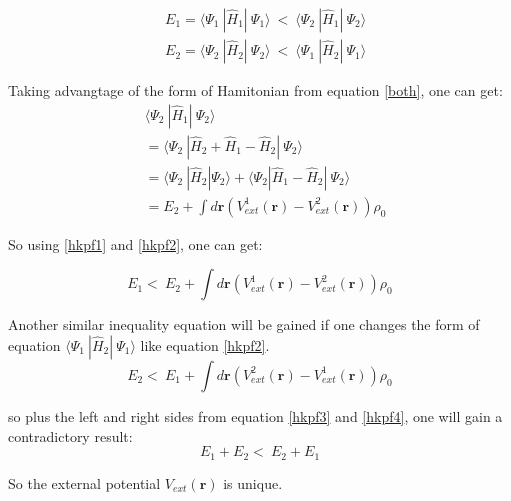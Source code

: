 \documentclass[a4paper, 12pt, titlepage,oneside,drop]{kthesis}
\begin{document}
\begin{equation}\label{hkpf1}\begin{split}
&  E_1 = \langle \Psi_1\ |\hat{H}_{1}|\ \Psi_1 \rangle  \ < \  \langle \Psi_2\ |\hat{H}_{1}|\ \Psi_2 \rangle\\
&  E_2 = \langle \Psi_2\ |\hat{H}_{2}|\ \Psi_2 \rangle  \ < \  \langle \Psi_1\ |\hat{H}_{2}|\ \Psi_1 \rangle
\end{split}\end{equation}

\noindent Taking advangtage of the form of Hamitonian from equation \ref{both}, one can get:
\begin{equation}\label{hkpf2}\begin{split}
&    \langle \Psi_2\ |\hat{H}_{1}|\ \Psi_2 \rangle \\
&  = \langle \Psi_2\ |\hat{H}_{2} + \hat{H}_{1} - \hat{H}_{2}|\ \Psi_2 \rangle \\
&  = \langle \Psi_2\ |\hat{H}_{2} |\Psi_2 \rangle + \langle \Psi_2 | \hat{H}_{1} - \hat{H}_{2}|\ \Psi_2 \rangle \\
&  = E_2 + \int d \textbf{r} ( V^{1}_\textit{ext}(\textbf{r}) - V^{2}_\textit{ext}(\textbf{r}) )  \rho_0
\end{split}\end{equation}

\noindent So using \ref{hkpf1} and \ref{hkpf2}, one can get:

\begin{equation}\label{hkpf3}
 E_1  < \  E_2 + \int d \textbf{r} ( V^{1}_\textit{ext}(\textbf{r}) - V^{2}_\textit{ext}(\textbf{r}) )  \rho_0
\end{equation}

\noindent Another similar inequality equation will be gained if one changes the form of equation $\langle \Psi_1\ |\hat{H}_{2}|\ \Psi_1 \rangle$ like equation \ref{hkpf2}.
\begin{equation}\label{hkpf4}
  E_2  < \  E_1 + \int d \textbf{r} ( V^{2}_\textit{ext}(\textbf{r}) - V^{1}_\textit{ext}(\textbf{r}) )  \rho_0
\end{equation}

\noindent so plus the left and right sides from equation \ref{hkpf3} and \ref{hkpf4}, one will gain a contradictory result:
\begin{equation}\label{hkpf4}
  E_1 + E_2  < \  E_2 + E_1
\end{equation}

\noindent So the external potential $V_\textit{ext}(\textbf{r})$ is unique.
\end{document}
